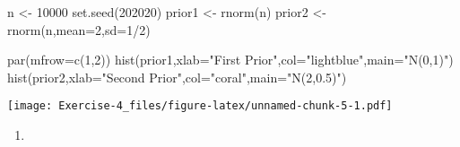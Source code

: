 \documentclass[
]{article}
\newenvironment{Shaded}{\begin{snugshade}}{\end{snugshade}}
\newcommand{\AttributeTok}[1]{\textcolor[rgb]{0.77,0.63,0.00}{#1}}
\newcommand{\DecValTok}[1]{\textcolor[rgb]{0.00,0.00,0.81}{#1}}
\newcommand{\FunctionTok}[1]{\textcolor[rgb]{0.00,0.00,0.00}{#1}}
\newcommand{\NormalTok}[1]{#1}
\newcommand{\OtherTok}[1]{\textcolor[rgb]{0.56,0.35,0.01}{#1}}
\newcommand{\SpecialCharTok}[1]{\textcolor[rgb]{0.00,0.00,0.00}{#1}}
\newcommand{\StringTok}[1]{\textcolor[rgb]{0.31,0.60,0.02}{#1}}
\providecommand{\tightlist}{%
  \setlength{\itemsep}{0pt}\setlength{\parskip}{0pt}}
\begin{document}
\begin{Shaded}
\begin{Highlighting}[]
\NormalTok{n }\OtherTok{\textless{}{-}} \DecValTok{10000}
\FunctionTok{set.seed}\NormalTok{(}\DecValTok{202020}\NormalTok{)}
\NormalTok{prior1 }\OtherTok{\textless{}{-}} \FunctionTok{rnorm}\NormalTok{(n)}
\NormalTok{prior2 }\OtherTok{\textless{}{-}} \FunctionTok{rnorm}\NormalTok{(n,}\AttributeTok{mean=}\DecValTok{2}\NormalTok{,}\AttributeTok{sd=}\DecValTok{1}\SpecialCharTok{/}\DecValTok{2}\NormalTok{)}

\FunctionTok{par}\NormalTok{(}\AttributeTok{mfrow=}\FunctionTok{c}\NormalTok{(}\DecValTok{1}\NormalTok{,}\DecValTok{2}\NormalTok{))}
\FunctionTok{hist}\NormalTok{(prior1,}\AttributeTok{xlab=}\StringTok{"First Prior"}\NormalTok{,}\AttributeTok{col=}\StringTok{"lightblue"}\NormalTok{,}\AttributeTok{main=}\StringTok{"N(0,1)"}\NormalTok{)}
\FunctionTok{hist}\NormalTok{(prior2,}\AttributeTok{xlab=}\StringTok{"Second Prior"}\NormalTok{,}\AttributeTok{col=}\StringTok{"coral"}\NormalTok{,}\AttributeTok{main=}\StringTok{"N(2,0.5)"}\NormalTok{)}
\end{Highlighting}
\end{Shaded}

\texttt{[image: Exercise-4\_files/figure-latex/unnamed-chunk-5-1.pdf]}

\begin{enumerate}
\def\labelenumi{\arabic{enumi}.}
\setcounter{enumi}{1}
\tightlist
\item
\end{enumerate}
\end{document}
